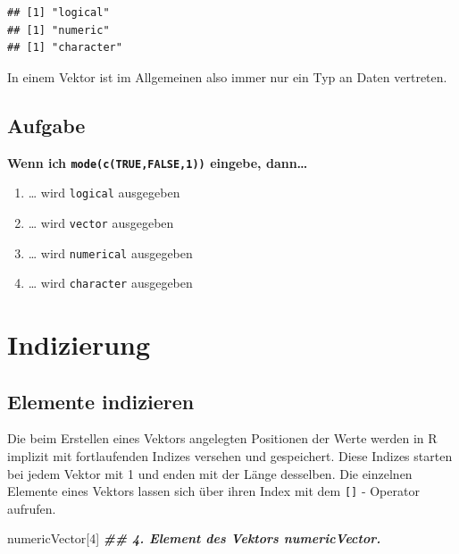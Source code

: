 \documentclass[
]{book}
\newenvironment{Shaded}{\begin{snugshade}}{\end{snugshade}}
\newcommand{\DecValTok}[1]{\textcolor[rgb]{0.00,0.00,0.81}{#1}}
\newcommand{\DocumentationTok}[1]{\textcolor[rgb]{0.56,0.35,0.01}{\textbf{\textit{#1}}}}
\newcommand{\NormalTok}[1]{#1}
\providecommand{\tightlist}{%
  \setlength{\itemsep}{0pt}\setlength{\parskip}{0pt}}
\begin{document}
\begin{verbatim}
## [1] "logical"
## [1] "numeric"
## [1] "character"
\end{verbatim}

In einem Vektor ist im Allgemeinen also immer nur ein Typ an Daten vertreten.

\hypertarget{aufgabe-2}{%
\subsection{Aufgabe}\label{aufgabe-2}}

\textbf{Wenn ich \texttt{mode(c(\textquotesingle{}TRUE\textquotesingle{},FALSE,1))} eingebe, dann\ldots{}}

\begin{enumerate}
\def\labelenumi{\Alph{enumi})}
\tightlist
\item
  \ldots{} wird \texttt{logical} ausgegeben
\item
  \ldots{} wird \texttt{vector} ausgegeben
\item
  \ldots{} wird \texttt{numerical} ausgegeben
\item
  \ldots{} wird \texttt{character} ausgegeben
\end{enumerate}

\hypertarget{indizierung}{%
\section{Indizierung}\label{indizierung}}

\hypertarget{elemente-indizieren}{%
\subsection{Elemente indizieren}\label{elemente-indizieren}}

Die beim Erstellen eines Vektors angelegten Positionen der Werte werden in R implizit mit fortlaufenden Indizes versehen und gespeichert. Diese Indizes starten bei jedem Vektor mit 1 und enden mit der Länge desselben.
Die einzelnen Elemente eines Vektors lassen sich über ihren Index mit dem \texttt{{[}{]}} - Operator aufrufen.

\begin{Shaded}
\begin{Highlighting}[]
\NormalTok{numericVector[}\DecValTok{4}\NormalTok{] }\DocumentationTok{\#\# 4. Element des Vektors numericVector.}
\end{Highlighting}
\end{Shaded}
\end{document}
